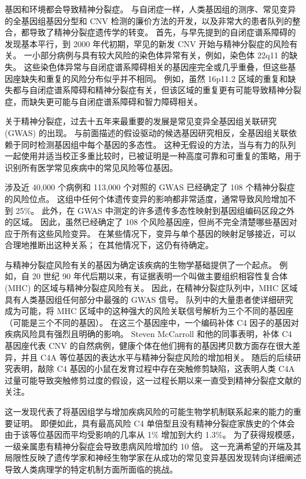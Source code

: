 基因和环境都会导致精神分裂症。 与自闭症一样，人类基因组的测序、常见变异的全基因组基因分型和 CNV 检测的廉价方法的开发，以及非常大的患者队列的整合，都导致了精神分裂症遗传学的转变。 首先，与早先提到的自闭症谱系障碍的发现基本平行，到 2000 年代初期，罕见的新发 CNV 开始与精神分裂症的风险有关。 一小部分病例与具有较大风险的染色体异常有关，例如，染色体 22q11 的缺失。 这些染色体异常与自闭症谱系障碍相关的基因座完全或几乎重叠，但这些基因座缺失和重复的风险分布似乎并不相同。 例如，虽然 16p11.2 区域的重复和缺失都与自闭症谱系障碍和精神分裂症有关，但该区域的重复更有可能导致精神分裂症，而缺失更可能与自闭症谱系障碍和智力障碍相关。

关于精神分裂症，过去十五年来最重要的发展是常见变异全基因组关联研究 (GWAS) 的出现。 与前面描述的假设驱动的候选基因研究相反，全基因组关联依赖于同时检测基因组中每个基因的多态性。 这种无假设的方法，当与有力的队列一起使用并适当校正多重比较时，已被证明是一种高度可靠和可重复的策略，用于识别所有医学常见疾病中的常见风险等位基因。

涉及近 40,000 个病例和 113,000 个对照的 GWAS 已经确定了 108 个精神分裂症的风险位点。 这组中任何个体遗传变异的影响都非常适度，通常导致风险增加不到 25\%。 此外，在 GWAS 中测定的许多遗传多态性映射到基因组编码区段之外的区域。 因此，虽然已经确定了 108 个风险基因座，但尚不完全清楚哪些基因对应于所有这些风险变异。 在某些情况下，变异与单个基因的映射足够接近，可以合理地推断出这种关系； 在其他情况下，这仍有待确定。

与精神分裂症风险有关的基因为确定该疾病的生物学基础提供了一个起点。 例如，自 20 世纪 90 年代后期以来，有证据表明一个叫做主要组织相容性复合体 (MHC) 的区域与精神分裂症风险有关。 因此，在精神分裂症队列中，MHC 区域具有人类基因组任何部分中最强的 GWAS 信号。 队列中的大量患者使详细研究成为可能，将 MHC 区域中的这种强大的风险关联信号解析为三个不同的基因座（可能是三个不同的基因）。 在这三个基因座中，一个编码补体 C4 因子的基因对疾病风险具有强烈且明确的影响。 Steven McCarroll 和他的同事表明，补体 C4 基因座代表 CNV 的自然病例，健康个体在他们拥有的基因拷贝数方面存在很大差异，并且 C4A 等位基因的表达水平与精神分裂症风险的增加相关。 随后的后续研究表明，敲除 C4 基因的小鼠在发育过程中存在突触修剪缺陷，这表明人类 C4A 过量可能导致突触修剪过度的假设，这一过程长期以来一直受到精神分裂症文献的关注。

这一发现代表了将基因组学与增加疾病风险的可能生物学机制联系起来的能力的重要证明。 即便如此，具有最高风险 C4 单倍型且没有精神分裂症家族史的个体会由于该等位基因而平均受影响的几率从 1\% 增加到大约 1.3\%。 为了获得规模感，一级亲属患有精神分裂症会导致患病风险增加约 10 倍。 这一充满希望的开端及其局限性反映了遗传学家和神经生物学家在从成功的常见变异基因发现转向详细阐述导致人类病理学的特定机制方面所面临的挑战。

